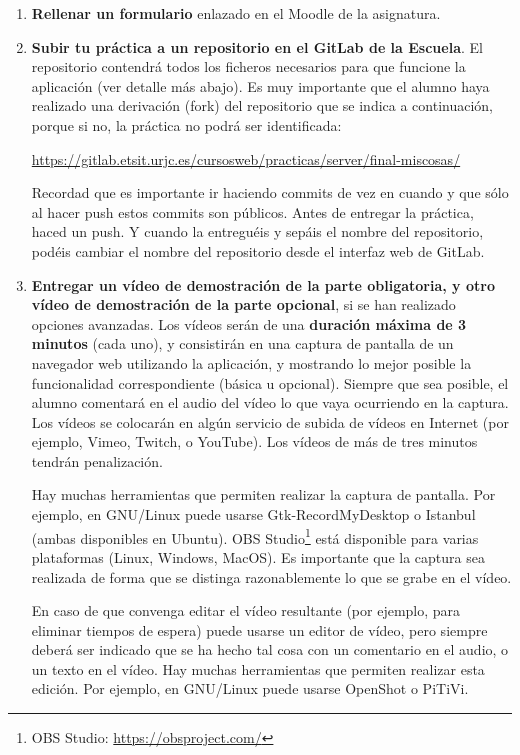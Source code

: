 \begin{enumerate}

  \item {\bf Rellenar un formulario} enlazado en el Moodle de la asignatura.
  
  \item {\bf Subir tu práctica a un repositorio en el GitLab de la Escuela}. El repositorio contendrá todos los ficheros necesarios para que funcione la aplicación (ver detalle más abajo). Es muy importante que el alumno haya realizado una derivación (fork) del repositorio que se indica a continuación, porque si no, la práctica no podrá ser identificada: 

\url{https://gitlab.etsit.urjc.es/cursosweb/practicas/server/final-miscosas/}

Recordad que es importante ir haciendo commits de vez en cuando y que sólo al hacer push estos commits son públicos. Antes de entregar la práctica, haced un push. Y cuando la entreguéis y sepáis el nombre del repositorio, podéis cambiar el nombre del repositorio desde el interfaz web de GitLab. 
 
 \item {\bf Entregar un vídeo de demostración de la parte obligatoria, y otro vídeo de demostración de la parte opcional}, si se han realizado opciones avanzadas. Los vídeos serán de una {\bf duración máxima de 3 minutos} (cada uno), y consistirán en una captura de pantalla de un navegador web utilizando la aplicación, y mostrando lo mejor posible la funcionalidad correspondiente (básica u opcional). Siempre que sea posible, el alumno comentará en el audio del vídeo lo que vaya ocurriendo en la captura. Los vídeos se colocarán en algún servicio de subida de vídeos en Internet (por ejemplo, Vimeo, Twitch, o YouTube). Los vídeos de más de tres minutos tendrán penalización.

Hay muchas herramientas que permiten realizar la captura de pantalla. Por ejemplo, en GNU/Linux puede usarse Gtk-RecordMyDesktop o Istanbul (ambas disponibles en Ubuntu). OBS Studio\footnote{OBS Studio: \url{https://obsproject.com/}} está disponible para varias plataformas (Linux, Windows, MacOS). Es importante que la captura sea realizada de forma que se distinga razonablemente lo que se grabe en el vídeo.

En caso de que convenga editar el vídeo resultante (por ejemplo, para eliminar tiempos de espera) puede usarse un editor de vídeo, pero siempre deberá ser indicado que se ha hecho tal cosa con un comentario en el audio, o un texto en el vídeo. Hay muchas herramientas que permiten realizar esta edición. Por ejemplo, en GNU/Linux puede usarse OpenShot o PiTiVi.

\end{enumerate}

